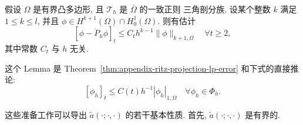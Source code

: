\setcounter{statement}{0}
\begin{Lemma}\label{lem:navier-upwind-projection-mesh-norm}
假设 $\Omega$ 是有界凸多边形, 且 $\mathcal T_h$ 是 $\bar\Omega$ 的一致正则
三角剖分族. 设某个整数 $k$ 满足 $1\leq k\leq l$, 并且
$\phi\in H^{k+1}(\Omega)\cap H_0^1(\Omega)$. 则有估计
\begin{equation}\label{eq:navier-upwind-projection-mesh-estimate}
[\phi-\mathring P_h\phi]_t
\leq C_t h^{k-1}\|\phi\|_{k+1,\Omega}
\quad\forall t\geq2,
\end{equation}
其中常数 $C_t$ 与 $h$ 无关.
\end{Lemma}

这个 Lemma 是 Theorem~\ref{thm:appendix-ritz-projection-lp-error} 和下式的直接推论:
\begin{equation}\label{eq:navier-upwind-inverse-mesh-norm}
[\phi_h]_t\leq C(t)h^{-1}|\phi_h|_{1,\Omega}
\quad\forall\phi_h\in\Phi_h.
\end{equation}

这些准备工作可以导出
$\widetilde a(\mathord\cdot;\mathord\cdot,\mathord\cdot)$ 的若干基本性质.
首先, $\widetilde a(\mathord\cdot;\mathord\cdot,\mathord\cdot)$ 是有界的.

